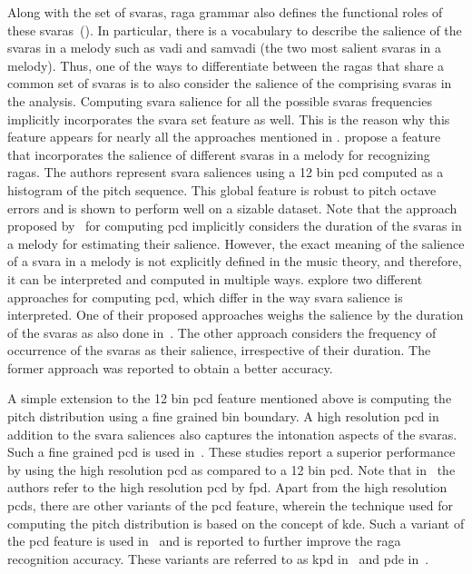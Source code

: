 Along with the set of \glspl{svara}, \gls{raga} grammar also defines the functional roles of these \glspl{svara}~(). In particular, there is a vocabulary to describe the salience of the \glspl{svara} in a melody such as \gls{vadi} and \gls{samvadi} (the two most salient \glspl{svara} in a melody). Thus, one of the ways to differentiate between the \glspl{raga} that share a common set of \glspl{svara} is to also consider the salience of the comprising \glspl{svara} in the analysis. Computing \gls{svara} salience for all the possible \glspl{svara} frequencies implicitly incorporates the \gls{svara} set feature as well. This is the reason why this feature appears for nearly all the approaches mentioned in . \cite{chordia2007raag} propose a feature that incorporates the salience of different \glspl{svara} in a melody for recognizing \glspl{raga}. The authors represent \gls{svara} saliences using a 12 bin \gls{pcd} computed as a histogram of the pitch sequence. This global feature is robust to pitch octave errors and is shown to perform well on a sizable dataset. Note that the approach proposed by~\cite{chordia2007raag} for computing \gls{pcd} implicitly considers the duration of the \glspl{svara} in a melody for estimating their salience. However, the exact meaning of the salience of a \gls{svara} in a melody is not explicitly defined in the music theory, and therefore, it can be interpreted and computed in multiple ways. \cite{koduri2011survey} explore two different approaches for computing \gls{pcd}, which differ in the way \gls{svara} salience is interpreted. One of their proposed approaches weighs the salience by the duration of the \glspl{svara} as also done in~\cite{chordia2007raag}. The other approach considers the frequency of occurrence of the \glspl{svara} as their salience, irrespective of their duration. The former approach was reported to obtain a better accuracy.

A simple extension to the 12 bin \gls{pcd} feature mentioned above is computing the pitch distribution using a fine grained bin boundary. A high resolution \gls{pcd} in addition to the \gls{svara} saliences also captures the intonation aspects of the \glspl{svara}. Such a fine grained \gls{pcd} is used in~\cite{chordia2013joint,koduri2012raga,belle2009raga,kumar2014identifying}. These studies report a superior performance by using the high resolution \gls{pcd} as compared to a 12 bin \gls{pcd}. Note that in~\cite{chordia2013joint} the authors refer to the high resolution \gls{pcd} by \gls{fpd}. Apart from the high resolution \glspl{pcd}, there are other variants of the \gls{pcd} feature, wherein the technique used for computing the pitch distribution is based on the concept of \gls{kde}. Such a variant of the \gls{pcd} feature is used in~\cite{chordia2013joint,ranjani2011carnatic} and is reported to further improve the \gls{raga} recognition accuracy. These variants are referred to as \gls{kpd} in~\cite{chordia2013joint} and \gls{pde} in~\cite{ranjani2011carnatic}. 

